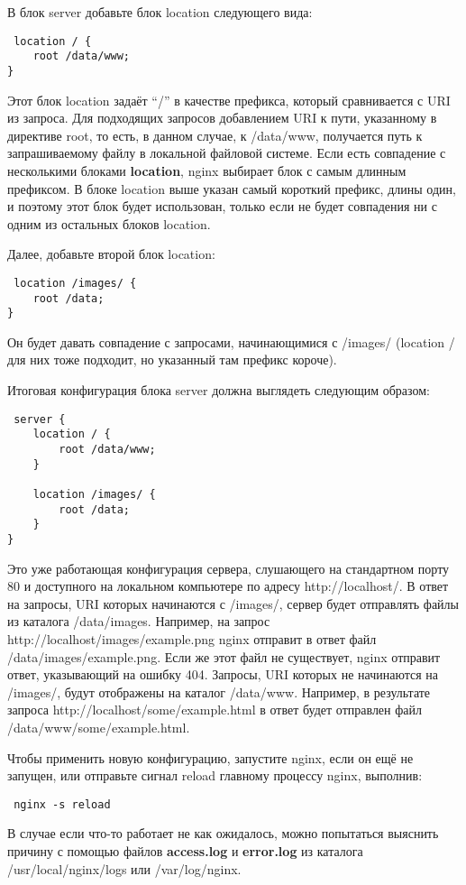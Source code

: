 \documentclass[a4paper,10pt,twoside]{article}
\begin{document}
В блок server добавьте блок location следующего вида:

\begin{verbatim}
 location / {
    root /data/www;
}
\end{verbatim} 
Этот блок location задаёт “/” в качестве префикса, который сравнивается с URI из запроса. Для подходящих запросов добавлением URI к пути, указанному в директиве root, то есть, в данном случае, к /data/www, получается путь к запрашиваемому файлу в локальной файловой системе. Если есть совпадение с несколькими блоками \textbf{location}, nginx выбирает блок с самым длинным префиксом. В блоке location выше указан самый короткий префикс, длины один, и поэтому этот блок будет использован, только если не будет совпадения ни с одним из остальных блоков location.

Далее, добавьте второй блок location:

\begin{verbatim}
 location /images/ {
    root /data;
}
\end{verbatim} 
Он будет давать совпадение с запросами, начинающимися с /images/ (location / для них тоже подходит, но указанный там префикс короче).

Итоговая конфигурация блока server должна выглядеть следующим образом:

\begin{verbatim}
 server {
    location / {
        root /data/www;
    }

    location /images/ {
        root /data;
    }
}
\end{verbatim} 
Это уже работающая конфигурация сервера, слушающего на стандартном порту 80 и доступного на локальном компьютере по адресу http://localhost/. В ответ на запросы, URI которых начинаются с /images/, сервер будет отправлять файлы из каталога /data/images. Например, на запрос http://localhost/images/example.png nginx отправит в ответ файл /data/images/example.png. Если же этот файл не существует, nginx отправит ответ, указывающий на ошибку 404. Запросы, URI которых не начинаются на /images/, будут отображены на каталог /data/www. Например, в результате запроса http://localhost/some/example.html в ответ будет отправлен файл /data/www/some/example.html.

Чтобы применить новую конфигурацию, запустите nginx, если он ещё не запущен, или отправьте сигнал reload главному процессу nginx, выполнив:

\begin{verbatim}
 nginx -s reload
\end{verbatim} 
В случае если что-то работает не как ожидалось, можно попытаться выяснить причину с помощью файлов \textbf{access.log} и \textbf{error.log} из каталога /usr/local/nginx/logs или /var/log/nginx.
\end{document}
